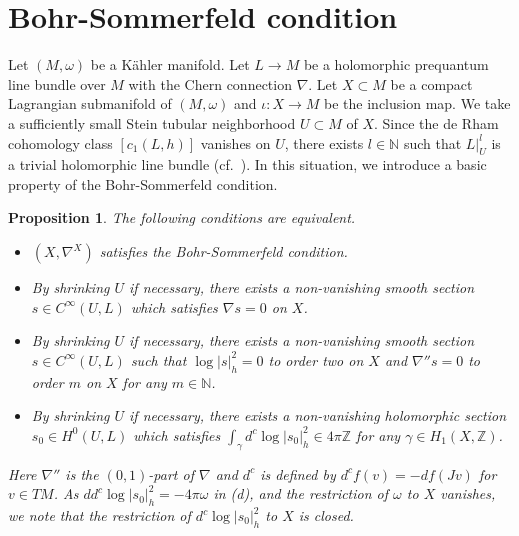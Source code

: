 \documentclass[12pt,oneside]{amsart}
\theoremstyle{plain}
\newtheorem{proposition}{Proposition}
\theoremstyle{definition}
\theoremstyle{remark}
\begin{document}
\section{Bohr-Sommerfeld condition}\label{section:2}
Let $(M, \omega)$ be a K\"ahler manifold.  
Let $L \to M$ be a holomorphic prequantum line bundle over $M$ with the Chern connection $\nabla$.  
Let $X \subset M$ be a compact Lagrangian submanifold of $(M, \omega)$ and $\iota: X \to M$ be the inclusion map.  
We take a sufficiently small Stein tubular neighborhood $U \subset M$ of $X$.  
Since the de Rham cohomology class $[c_{1}(L, h)]$ vanishes on $U$, there exists $l \in \mathbb{N}$ such that $L|_{U}^l$ is a trivial holomorphic line bundle (cf.~\cite{Gue}). 
In this situation, we introduce a basic property of the Bohr-Sommerfeld condition.    
\begin{proposition}\label{proposition:1}
The following conditions are equivalent.  
\begin{itemize}
\item[(a)]
$(X, \nabla^{X})$ satisfies the Bohr-Sommerfeld condition.  
\item[(b)]
By shrinking $U$ if necessary, there exists a non-vanishing smooth section $s \in C^{\infty}(U, L)$ which satisfies $\nabla s = 0$ on $X$. 
\item[(c)]
By shrinking $U$ if necessary, 
there exists a non-vanishing smooth section $s \in C^{\infty}(U, L)$ such that $\log |s|^2_{h} = 0$ to order two on $X$ and $\nabla'' s = 0$ to order $m$ on $X$ for any $m \in \mathbb{N}$.  
\item[(d)]
By shrinking $U$ if necessary, 
there exists a non-vanishing holomorphic section $s_{0} \in H^0(U, L)$ which satisfies 
$\int_{\gamma}d^{c}\log |s_{0}|^2_{h} \in 4\pi \mathbb{Z}$ for any $\gamma \in H_1(X, \mathbb{Z})$.  
\end{itemize}
Here $\nabla''$ is the $(0, 1)$-part of $\nabla$ and $d^c$ is defined by $d^c f(v) = -df (Jv)$ for $v \in TM$.   
As $dd^c \log |s_0|_h^2 = -4\pi \omega$ in (d), and the restriction of $\omega$ to $X$ vanishes, we note that the restriction of $d^c \log |s_0|_h^2$ to $X$ is closed.  
\end{proposition}
\end{document}
